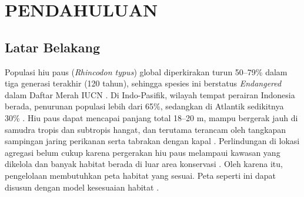 
\chapter{PENDAHULUAN}

\section{Latar Belakang}


Populasi hiu paus (\textit{Rhincodon typus}) global diperkirakan turun 50--79\%
dalam tiga generasi terakhir (120 tahun), sehingga spesies ini berstatus
\textit{Endangered} dalam Daftar Merah IUCN \citep{Pierce2025}. Di
Indo-Pasifik, wilayah tempat perairan Indonesia berada, penurunan populasi
lebih dari 65\%, sedangkan di Atlantik sedikitnya 30\% \citep{Pierce2025}. Hiu
paus dapat mencapai panjang total 18--20 m, mampu bergerak jauh di samudra
tropis dan subtropis hangat, dan terutama terancam oleh tangkapan sampingan
jaring perikanan serta tabrakan dengan kapal \citep{Pierce2025}. Perlindungan di lokasi agregasi belum cukup karena
pergerakan hiu paus melampaui kawasan yang dikelola dan banyak habitat berada di
luar area konservasi \citep{Reynolds2017,Putra2026}. Oleh karena itu,
pengelolaan membutuhkan peta habitat yang sesuai. Peta seperti ini dapat
disusun dengan model kesesuaian habitat \citep{Putra2026}.

